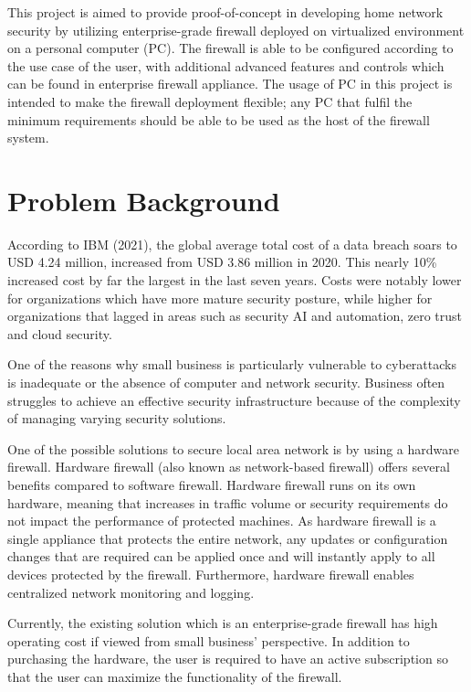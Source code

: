 \documentclass[../index.tex]{subfiles}
\begin{document}
This project is aimed to provide proof-of-concept in developing home network security by utilizing enterprise-grade firewall deployed on virtualized environment on a personal computer (PC). The firewall is able to be configured according to the use case of the user, with additional advanced features and controls which can be found in enterprise firewall appliance. The usage of PC in this project is intended to make the firewall deployment flexible; any PC that fulfil the minimum requirements should be able to be used as the host of the firewall system.

\section{Problem Background}

According to IBM (2021), the global average total cost of a data breach soars to USD 4.24 million, increased from USD 3.86 million in 2020. This nearly 10\% increased cost by far the largest in the last seven years. Costs were notably lower for organizations which have more mature security posture, while higher for organizations that lagged in areas such as security AI and automation, zero trust and cloud security.

One of the reasons why small business is particularly vulnerable to cyberattacks is inadequate or the absence of computer and network security. Business often struggles to achieve an effective security infrastructure because of the complexity of managing varying security solutions.

One of the possible solutions to secure local area network is by using a hardware firewall. Hardware firewall (also known as network-based firewall) offers several benefits compared to software firewall. Hardware firewall runs on its own hardware, meaning that increases in traffic volume or security requirements do not impact the performance of protected machines. As hardware firewall is a single appliance that protects the entire network, any updates or configuration changes that are required can be applied once and will instantly apply to all devices protected by the firewall. Furthermore, hardware firewall enables centralized network monitoring and logging.

Currently, the existing solution which is an enterprise-grade firewall has high operating cost if viewed from small business' perspective. In addition to purchasing the hardware, the user is required to have an active subscription so that the user can maximize the functionality of the firewall.
\end{document}
